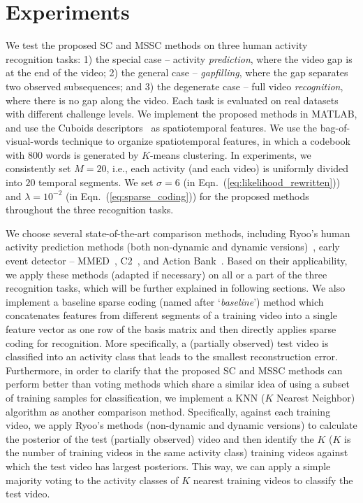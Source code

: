 \section{Experiments}\label{sec:experiments}

We test the proposed SC and MSSC methods on three human activity recognition
tasks: 1) the special case {\color{black}--} activity \textit{prediction},
where {\color{black}the} video gap is at the end of the video; 2) the general
case {\color{black}--} \textit{gapfilling}, where {\color{black}the} gap
separates two observed subsequences; and 3) the degenerate case
{\color{black}--} full video \textit{recognition}, where there is no gap along
the video. Each task is evaluated on real datasets with different challenge
levels. We implement the proposed methods in MATLAB, and use the Cuboids
descriptors~\cite{DollarVSPETS05cuboids} as spatiotemporal features. We use the
bag-of-visual-words technique to organize spatiotemporal features, in which a
codebook with $800$ words is generated by $K$-means clustering.  In
experiments, we consistently set $M=20$, i.e., each activity (and each video)
is uniformly divided into $20$ temporal segments.  We set $\sigma=6$ (in
Eqn.~(\ref{eq:likelihood_rewritten})) and $\lambda=10^{-2}$ (in
Eqn.~(\ref{eq:sparse_coding})) for the proposed methods throughout the three
recognition tasks.

We choose several state-of-the-art comparison methods, including Ryoo's human
activity prediction methods (both non-dynamic and dynamic
versions)~\cite{Ryoo2011}, early event detector -- MMED~\cite{MMED2012},
C2~\cite{Jhuang07abiologically}, and Action Bank~\cite{SaCoCVPR2012}.  Based on
their applicability, we apply these methods (adapted if necessary) on all or a
part of the three recognition tasks, which will be further explained in
following sections.  We also implement a baseline sparse coding (named after
`\textit{baseline}') method which concatenates features from different segments
of a training video into a single feature vector as one row of the basis matrix
and then directly applies sparse coding for recognition. More specifically, a
(partially observed) test video is classified into an activity class that leads
to the smallest reconstruction error.  Furthermore, in order to clarify that
the proposed SC and MSSC methods can perform better than voting methods which
share a similar idea of using a subset of training samples for classification,
we implement a KNN ($K$ Nearest Neighbor) algorithm as another comparison
method. Specifically, against each training video, we apply Ryoo's methods
(non-dynamic and dynamic versions) to calculate the posterior of the test
(partially observed) video and then identify the $K$ ($K$ is the number of
training videos in the same activity class) training videos against which the
test video has largest posteriors. This way, we can apply a simple majority
voting to the activity classes of $K$ nearest training videos to classify the
test video.

